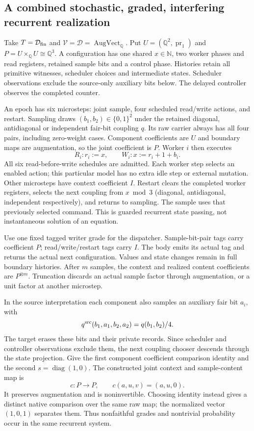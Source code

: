 \documentclass[11pt]{article}
\begin{document}
\subsection{A combined stochastic, graded, interfering recurrent realization}\label{sec:combined-feedback-model}

Take $T=\mathcal D_{\rm fin}$ and $\mathcal V=\mathcal D=\operatorname{AugVect}_{\mathbb Q}$. Put $U=(\mathbb Q^2,\operatorname{pr}_1)$ and $P=U\times_{\mathbb Q}U\cong\mathbb Q^3$. A configuration has one shared $x\in\mathbb N$, two worker phases and read registers, retained sample bits and a control phase. Histories retain all primitive witnesses, scheduler choices and intermediate states. Scheduler observations exclude the source-only auxiliary bits below. The delayed controller observes the completed counter.

An epoch has six microsteps: joint sample, four scheduled read/write actions, and restart. Sampling draws $(b_1,b_2)\in\{0,1\}^2$ under the retained diagonal, antidiagonal or independent fair-bit coupling $q$. Its raw carrier always has all four pairs, including zero-weight cases. Component coefficients are $U$ and boundary maps are augmentation, so the joint coefficient is $P$. Worker $i$ then executes
\[
 R_i:r_i:=x,\qquad W_i:x:=r_i+1+b_i.
\]
All six read-before-write schedules are admitted. Each worker step selects an enabled action; this particular model has no extra idle step or external mutation. Other microsteps have context coefficient $I$. Restart clears the completed worker registers, selects the next coupling from $x\bmod3$ (diagonal, antidiagonal, independent respectively), and returns to sampling. The sample uses that previously selected command. This is guarded recurrent state passing, not instantaneous solution of an equation.

Use one fixed tagged writer grade for the dispatcher. Sample-bit-pair tags carry coefficient $P$; read/write/restart tags carry $I$. The body emits its actual tag and returns the actual next configuration. Values and state changes remain in full boundary histories. After $m$ samples, the context and realized content coefficients are $P^{\otimes m}$. Truncation discards an actual sample factor through augmentation, or a unit factor at another microstep.

In the source interpretation each component also samples an auxiliary fair bit $a_i$, with
\[
 q^{\rm src}(b_1,a_1,b_2,a_2)=q(b_1,b_2)/4.
\]
The target erases these bits and their private records. Since scheduler and controller observations exclude them, the next coupling chooser descends through the state projection. Give the first component coefficient comparison identity and the second $s=\operatorname{diag}(1,0)$. The constructed joint context and sample-content map is
\[
 c:P\to P,\qquad c(a,u,v)=(a,u,0). \tag{CM}\label{eq:combined-coefficient-map}
\]
It preserves augmentation and is noninvertible. Choosing identity instead gives a distinct native comparison over the same raw map; the normalized vector $(1,0,1)$ separates them. Thus nonfaithful grades and nontrivial probability occur in the same recurrent system.
\end{document}
